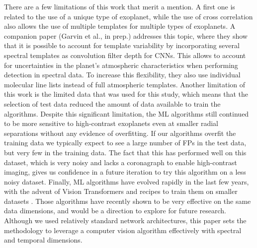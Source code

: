 \documentclass{aa}
\begin{document}
There are a few limitations of this work that merit a mention.
A first one is related to the use of a unique type of exoplanet, while the use of cross correlation also allows the use of multiple templates for multiple types of exoplanets.
A companion paper (Garvin et al., in prep.) addresses this topic, where they show that it is possible to account for template variability by incorporating several spectral templates as convolution filter depth for CNNs. 
This allows to account for uncertainties in the planet's atmospheric characteristics when performing detection in spectral data.
To increase this flexibility, they also use individual molecular line lists instead of full atmospheric templates.
Another limitation of this work is the limited data that was used for this study, which means that the selection of test data reduced the amount of data available to train the algorithms.
Despite this significant limitation, the ML algorithms still continued to be more sensitive to high-contrast exoplanets even at smaller radial separations without any evidence of overfitting.
If our algorithms overfit the training data we typically expect to see a large number of FPs in the test data, but very few in the training data. 
The fact that this has performed well on this dataset, which is very noisy and lacks a coronagraph to enable high-contrast imaging, gives us confidence in a future iteration to try this algorithm on a less noisy dataset.
Finally, ML algorithms have evolved rapidly in the last few years, with the advent of Vision Transformers \citep{2020ViT} and recipes to train them on smaller datasets \citep[e.g.,][]{2022Gani}. Those algorithms have recently shown to be very effective on the same data dimensions, and would be a direction to explore for future research. Although we used relatively standard network architectures, this paper sets the methodology to leverage a computer vision algorithm effectively with spectral and temporal dimensions.


\end{document}
